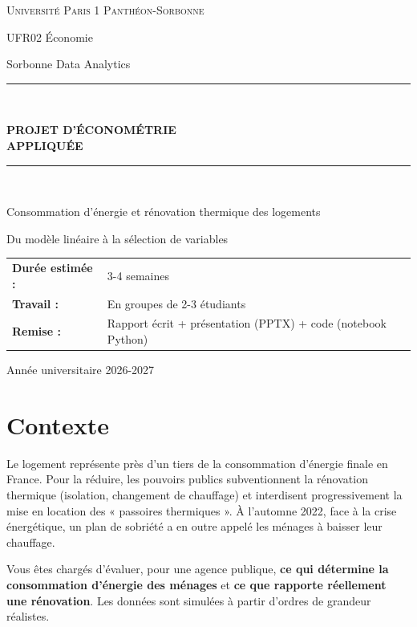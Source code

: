 \documentclass[11pt,a4paper]{article}
\begin{document}
\begin{titlepage}
\centering
\vspace*{2cm}
{\large\color{sorbonne}\textsc{Université Paris 1 Panthéon-Sorbonne}\par}
\vspace{0.3cm}
{\color{gray}UFR02 Économie\par\vspace{0.2cm}Sorbonne Data Analytics\par}
\vspace{2.5cm}
\rule{\linewidth}{1.5pt}\\[0.6cm]
{\Huge\bfseries\color{sorbonne} PROJET D'ÉCONOMÉTRIE\\[0.2cm] APPLIQUÉE\par}
\rule{\linewidth}{1.5pt}\\[1.2cm]
{\LARGE\color{gray} Consommation d'énergie et rénovation thermique des logements\par}
\vspace{0.5cm}
{\large\color{gray} Du modèle linéaire à la sélection de variables\par}
\vfill
\begin{tabular}{>{\bfseries}l l}
Durée estimée : & 3-4 semaines \\[0.2cm]
Travail : & En groupes de 2-3 étudiants \\[0.2cm]
Remise : & Rapport écrit + présentation (PPTX) + code (notebook Python)
\end{tabular}
\vfill
Année universitaire 2026-2027
\end{titlepage}

\tableofcontents
\newpage

\section*{Contexte}

Le logement représente près d'un tiers de la consommation d'énergie finale en France. Pour la réduire, les pouvoirs publics subventionnent la rénovation thermique (isolation, changement de chauffage) et interdisent progressivement la mise en location des « passoires thermiques ». À l'automne 2022, face à la crise énergétique, un plan de sobriété a en outre appelé les ménages à baisser leur chauffage.

Vous êtes chargés d'évaluer, pour une agence publique, \textbf{ce qui détermine la consommation d'énergie des ménages} et \textbf{ce que rapporte réellement une rénovation}. Les données sont simulées à partir d'ordres de grandeur réalistes.
\end{document}
